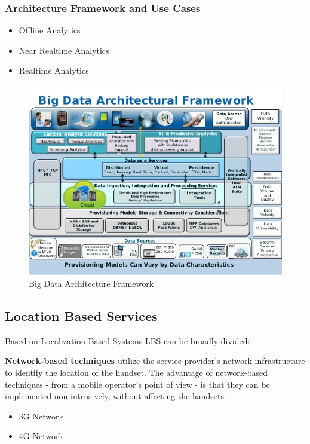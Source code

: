 \documentclass[11pt, oneside]{article}   	%
\begin{document}
\subsubsection{Architecture Framework and Use Cases}
\begin{itemize}
\item Offline Analytics
\item Near Realtime Analytics 
\item Realtime Analytics
\end{itemize}

\begin{figure}
  \centering
  \includegraphics[width=\linewidth]{big-data-solutions.png}
  \caption{Big Data Architecture Framework}
  \label{fig:bigdatasolutions}
\end{figure}



\subsection{Location Based Services}
Based on Localization-Based Systems LBS can be broadly divided:

\textbf{Network-based techniques} utilize the service provider's network infrastructure to identify the location of the handset. The advantage of network-based techniques - from a mobile operator's point of view - is that they can be implemented non-intrusively, without affecting the handsets.

\begin{itemize}
\item 3G Network
\item 4G Network 
\end{itemize}
\end{document}
